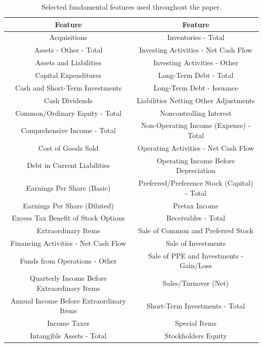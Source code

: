 \documentclass[pdflatex,sn-mathphys-num]{sn-jnl}%
\theoremstyle{thmstyleone}%
\theoremstyle{thmstyletwo}%
\theoremstyle{thmstylethree}%
\begin{document}
\begin{table}[!htbp]
	\centering
	\small
	\caption{Selected fundamental features used throughout the paper.}
	\label{Fundamentals}
	\begin{tabular}{c|c} 
		\toprule
		Feature & Feature \\
		\hline
		Acquisitions & Inventories - Total \\
		Assets - Other - Total & Investing Activities - Net Cash Flow \\
		Assets and Liabilities & Investing Activities - Other \\
		Capital Expenditures & Long-Term Debt - Total \\
		Cash and Short-Term Investments & Long-Term Debt - Issuance \\
		Cash Dividends & Liabilities Netting Other Adjustments \\
		Common/Ordinary Equity - Total & Noncontrolling Interest \\
		Comprehensive Income - Total & Non-Operating Income (Expense) - Total \\
		Cost of Goods Sold & Operating Activities - Net Cash Flow \\
		Debt in Current Liabilities & Operating Income Before Depreciation \\
		Earnings Per Share (Basic) & Preferred/Preference Stock (Capital) - Total \\
		Earnings Per Share (Diluted) & Pretax Income \\
		Excess Tax Benefit of Stock Options & Receivables - Total \\
		Extraordinary Items & Sale of Common and Preferred Stock \\
		Financing Activities - Net Cash Flow & Sale of Investments \\
		Funds from Operations - Other & Sale of PPE and Investments - Gain/Loss \\
		Quarterly Income Before Extraordinary Items & Sales/Turnover (Net) \\
		Annual Income Before Extraordinary Items & Short-Term Investments - Total \\
		Income Taxes & Special Items \\
		Intangible Assets - Total & Stockholders Equity \\
		\bottomrule
	\end{tabular}
\end{table}



\end{document}
